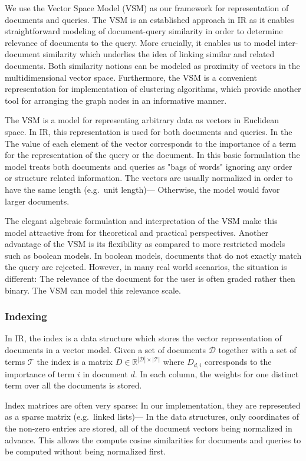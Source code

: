 We use the Vector Space Model (VSM) as our framework for representation of documents and queries. The VSM is an established approach in IR as it enables straightforward modeling of document-query similarity in order to determine relevance of documents to the query. More crucially, it enables us to model inter-document similarity which underlies the idea of linking similar and related documents. Both similarity notions can be modeled as proximity of vectors in the multidimensional vector space. Furthermore, the VSM is a convenient representation for implementation of clustering algorithms, which provide another tool for arranging the graph nodes in an informative manner.  

The VSM is a model for representing arbitrary data as vectors in Euclidean space. In IR, this representation is used for both documents and queries. In the The value of each element of the vector corresponds to the importance of a term for the representation of the query or the document. In this basic formulation the model treats both documents and queries as "bags of words" ignoring any order or structure related information. The vectors are usually normalized in order to have the same length (e.g.\ unit length)--- Otherwise, the model would favor larger documents. 

The elegant algebraic formulation and interpretation of the VSM make this model attractive from for theoretical and practical perspectives.
Another advantage of the VSM is its flexibility as compared to more restricted models such as boolean models. In boolean models, documents that do not exactly match the query are rejected. However, in many real world scenarios, the situation is different: The relevance of the document for the user is often graded rather then binary. The VSM can model this relevance scale.


\subsubsection{Indexing}
\label{sec:indexing}
In IR, the index is a data structure which stores the vector representation of documents in a vector model. Given a set of documents $\mathcal{D}$ together with a set of terms $\mathcal{T}$ the index is a matrix $D \in \mathbb{R}^{|\mathcal{D}|\times |\mathcal{T}|}$ where $D_{d,i}$ corresponds to the importance of term $i$ in document $d$. In each column, the weights for one distinct term over all the documents is stored.

Index matrices are often very sparse: In our implementation, they are represented as a sparse matrix (e.g.\ linked lists)--- In the data structures, only coordinates of the non-zero entries are stored, all of the document vectors being normalized in advance. This allows the compute cosine similarities for documents and queries to be computed without being normalized first.

